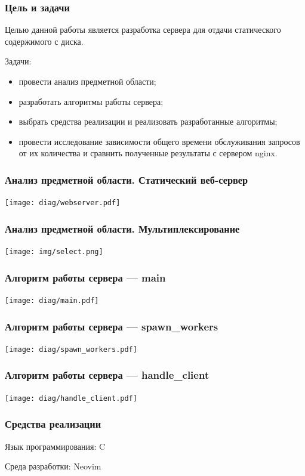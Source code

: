 \documentclass[gray]{beamer}
\begin{document}
\begin{frame}
    \frametitle{Цель и задачи}
    Целью данной работы является разработка сервера для отдачи статического содержимого с диска.

    \vfill

    Задачи:
    \begin{itemize}
        \item провести анализ предметной области;
        \item разработать алгоритмы работы сервера;
        \item выбрать средства реализации и реализовать разработанные алгоритмы;
        \item провести исследование зависимости общего времени обслуживания запросов от их количества и сравнить полученные результаты с сервером nginx.
    \end{itemize}
\end{frame}

\begin{frame}
    \frametitle{Анализ предметной области. Статический веб-сервер}
    \centering
    \texttt{[image: diag/webserver.pdf]}
\end{frame}

\begin{frame}
    \frametitle{Анализ предметной области. Мультиплексирование}
    \centering
    \texttt{[image: img/select.png]}
\end{frame}

\begin{frame}
    \frametitle{Алгоритм работы сервера --- main}
    \centering
    \texttt{[image: diag/main.pdf]}
\end{frame}

\begin{frame}
    \frametitle{Алгоритм работы сервера --- spawn\_workers}
    \centering
    \texttt{[image: diag/spawn\_workers.pdf]}
\end{frame}

\begin{frame}
    \frametitle{Алгоритм работы сервера --- handle\_client}
    \centering
    \texttt{[image: diag/handle\_client.pdf]}
\end{frame}

\begin{frame}
    \frametitle{Средства реализации}
    Язык программирования: C

    Среда разработки: Neovim
\end{frame}
\end{document}
